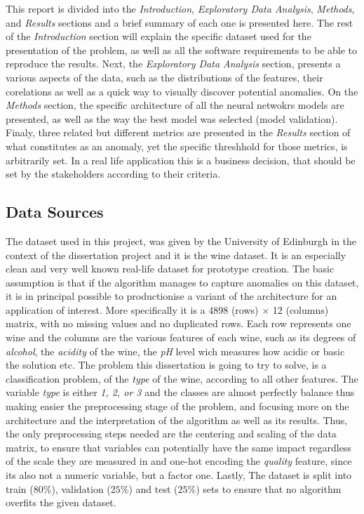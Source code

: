 \documentclass[11pt,twoside]{article}
\numberwithin{Theorem}{section}
\numberwithin{Definition}{section}
\numberwithin{Lemma}{section}
\numberwithin{Algorithm}{section}
\numberwithin{equation}{section}
\begin{document}
This report is divided into the \textit{Introduction}, \textit{Exploratory Data Analysis}, \textit{Methods}, and \textit{Results} sections and a brief summary of each one is presented here. The rest of the \textit{Introduction} section will explain the specific dataset used for the presentation of the problem, as well as all the software requirements to be able to reproduce the results. Next, the \textit{Exploratory Data Analysis} section, presents a various aspects of the data, such as the distributions of the features, their corelations as well as a quick way to visually discover potential anomalies. On the \textit{Methods} section, the specific architecture of all the neural netwokrs models are presented, as well as the way the best model was selected (model validation). Finaly, three related but different metrics are presented in the \textit{Results} section of what constitutes as an anomaly, yet the specific threshhold for those metrics, is arbitrarily set. In a real life application this is a business decision, that should be set by the stakeholders according to their criteria. 

\subsection{Data Sources}
\label{sec:back}
The dataset used in this project, was given by the University of Edinburgh in the context of the dissertation project and it is the wine dataset. It is an especially clean and very well known real-life dataset for prototype creation. The basic assumption is that if the algorithm manages to capture anomalies on this dataset, it is in principal possible to productionise a variant of the architecture for an application of interest. More specifically it is a 4898 (rows) $\times$ 12 (columns) matrix, with no missing values and no duplicated rows. Each row represents one wine and the columns are the various features of each wine, such as its degrees of \textit{alcohol}, the \textit{acidity} of the wine, the \textit{pH} level wich measures how acidic or basic the solution etc. The problem this dissertation is going to try to solve, is a classification problem, of the \textit{type} of the wine, according to all other features. The variable \textit{type} is either \textit{1, 2, or 3} and the classes are almost perfectly balance thus making easier the preprocessing stage of the problem, and focusing more on the architecture and the interpretation of the algorithm as well as its results. Thus, the only preprocessing steps needed are the centering and scaling of the data matrix, to ensure that variables can potentially have the same impact regardless of the scale they are measured in and one-hot encoding the \textit{quality} feature, since its also not a numeric variable, but a factor one. Lastly, The dataset is split into train ($80\%$), validation ($25\%$) and test ($25\%$) sets to ensure that no algorithm overfits the given dataset. 
\end{document}
